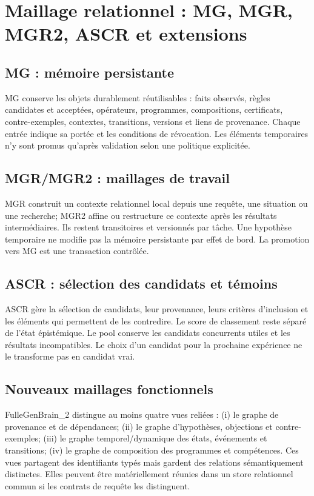 \documentclass[11pt,a4paper]{article}
\begin{document}
\section{Maillage relationnel : MG, MGR, MGR2, ASCR et extensions}
\subsection{MG : mémoire persistante}
MG conserve les objets durablement réutilisables : faits observés, règles candidates et acceptées, opérateurs, programmes, compositions, certificats, contre-exemples, contextes, transitions, versions et liens de provenance. Chaque entrée indique sa portée et les conditions de révocation. Les éléments temporaires n'y sont promus qu'après validation selon une politique explicitée.

\subsection{MGR/MGR2 : maillages de travail}
MGR construit un contexte relationnel local depuis une requête, une situation ou une recherche; MGR2 affine ou restructure ce contexte après les résultats intermédiaires. Ils restent transitoires et versionnés par tâche. Une hypothèse temporaire ne modifie pas la mémoire persistante par effet de bord. La promotion vers MG est une transaction contrôlée.

\subsection{ASCR : sélection des candidats et témoins}
ASCR gère la sélection de candidats, leur provenance, leurs critères d'inclusion et les éléments qui permettent de les contredire. Le score de classement reste séparé de l'état épistémique. Le pool conserve les candidats concurrents utiles et les résultats incompatibles. Le choix d'un candidat pour la prochaine expérience ne le transforme pas en candidat vrai.

\subsection{Nouveaux maillages fonctionnels}
FulleGenBrain\_2 distingue au moins quatre vues reliées : (i) le graphe de provenance et de dépendances; (ii) le graphe d'hypothèses, objections et contre-exemples; (iii) le graphe temporel/dynamique des états, événements et transitions; (iv) le graphe de composition des programmes et compétences. Ces vues partagent des identifiants typés mais gardent des relations sémantiquement distinctes. Elles peuvent être matériellement réunies dans un store relationnel commun si les contrats de requête les distinguent.
\end{document}
